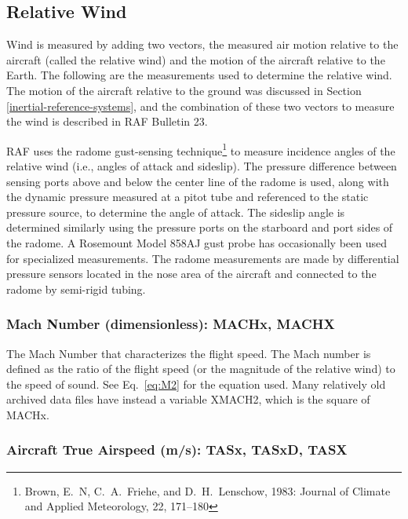 \documentclass[
  english,
]{book}
\begin{document}
\hypertarget{relative-wind}{%
\subsection{Relative Wind}\label{relative-wind}}

Wind is measured by adding two vectors, the measured air motion relative to the aircraft (called the relative wind) and the motion of the aircraft relative to the Earth. The following are the measurements used to determine the relative wind. The motion of the aircraft relative to the ground was discussed in Section \ref{inertial-reference-systems}, and the combination of these two vectors to measure the wind is described in RAF Bulletin 23.

RAF uses the radome\protect\hypertarget{radomeux20gust-sensingux20system}{}{} gust-sensing technique\footnote{Brown, E.~N, C.~A.~Friehe, and D.~H.~Lenschow, 1983: Journal of Climate and Applied Meteorology, 22, 171--180}
to measure incidence angles of the relative wind (i.e., angles of attack and sideslip). The pressure difference between sensing ports above and below the center line of the radome is used, along with the dynamic pressure measured at a pitot tube and referenced to the static pressure source, to determine the angle of attack. The sideslip angle is determined similarly using the pressure ports on the starboard and port sides of the radome. A Rosemount Model 858AJ gust probe has occasionally been used for specialized measurements. The radome measurements are made by differential pressure sensors located in the nose area of the aircraft and connected to the radome by semi-rigid tubing.

\hypertarget{mach-number}{%
\subsubsection*{Mach Number (dimensionless): MACHx, MACHX}\label{mach-number}}

The Mach Number that characterizes the flight speed. The Mach number is defined as the ratio of the flight speed (or the magnitude of the relative wind) to the speed of sound.
See Eq.~\eqref{eq:M2} for the equation used. Many relatively old archived data files have instead a variable XMACH2, which is the square of MACHx.

\hypertarget{true-airspeed}{%
\subsubsection*{Aircraft True Airspeed (m/s): TASx, TASxD, TASX}\label{true-airspeed}}
\end{document}
